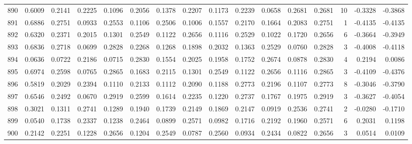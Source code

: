 \begin{tabular}{lrrrrrrrrrrrrrrr}
890 &      0.6009 &  0.2141 &  0.2225 &  0.1096 &  0.2056 &  0.1378 &  0.2207 &  0.1173 &  0.2239 &  0.0658 &   0.2681 &     0.2681 &     10 &                   -0.3328 &                    -0.3868 \\
891 &      0.6886 &  0.2751 &  0.0933 &  0.2553 &  0.1106 &  0.2506 &  0.1006 &  0.1557 &  0.2170 &  0.1664 &   0.2083 &     0.2751 &      1 &                   -0.4135 &                    -0.4135 \\
892 &      0.6320 &  0.2371 &  0.2015 &  0.1301 &  0.2549 &  0.1122 &  0.2656 &  0.1116 &  0.2529 &  0.1022 &   0.1720 &     0.2656 &      6 &                   -0.3664 &                    -0.3949 \\
893 &      0.6836 &  0.2718 &  0.0699 &  0.2828 &  0.2268 &  0.1268 &  0.1898 &  0.2032 &  0.1363 &  0.2529 &   0.0760 &     0.2828 &      3 &                   -0.4008 &                    -0.4118 \\
894 &      0.0636 &  0.0722 &  0.2186 &  0.0715 &  0.2830 &  0.1554 &  0.2025 &  0.1958 &  0.1752 &  0.2674 &   0.0878 &     0.2830 &      4 &                    0.2194 &                     0.0086 \\
895 &      0.6974 &  0.2598 &  0.0765 &  0.2865 &  0.1683 &  0.2115 &  0.1301 &  0.2549 &  0.1122 &  0.2656 &   0.1116 &     0.2865 &      3 &                   -0.4109 &                    -0.4376 \\
896 &      0.5819 &  0.2029 &  0.2394 &  0.1110 &  0.2133 &  0.1112 &  0.2090 &  0.1188 &  0.2773 &  0.2196 &   0.1107 &     0.2773 &      8 &                   -0.3046 &                    -0.3790 \\
897 &      0.6546 &  0.2492 &  0.0670 &  0.2919 &  0.2599 &  0.1614 &  0.2235 &  0.1220 &  0.2737 &  0.1767 &   0.1975 &     0.2919 &      3 &                   -0.3627 &                    -0.4054 \\
898 &      0.3021 &  0.1311 &  0.2741 &  0.1289 &  0.1940 &  0.1739 &  0.2149 &  0.1869 &  0.2147 &  0.0919 &   0.2536 &     0.2741 &      2 &                   -0.0280 &                    -0.1710 \\
899 &      0.0540 &  0.1738 &  0.2337 &  0.1238 &  0.2464 &  0.0899 &  0.2571 &  0.0982 &  0.1716 &  0.2192 &   0.1960 &     0.2571 &      6 &                    0.2031 &                     0.1198 \\
900 &      0.2142 &  0.2251 &  0.1228 &  0.2656 &  0.1204 &  0.2549 &  0.0787 &  0.2560 &  0.0934 &  0.2434 &   0.0822 &     0.2656 &      3 &                    0.0514 &                     0.0109 \\

\end{tabular}
